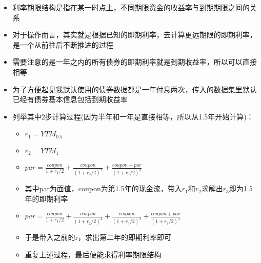 \documentclass[11pt]{article}
\providecommand{\tightlist}{%
      \setlength{\itemsep}{0pt}\setlength{\parskip}{0pt}}
\begin{document}
\begin{itemize}
\tightlist
\item
  利率期限结构是指在某一时点上，不同期限资金的收益率与到期期限之间的关系
\item
  对于操作而言，其实就是根据已知的即期利率，去计算更远期限的即期利率，是一个从前往后不断推进的过程
\item
  需要注意的是一年之内的所有债券的即期利率就是到期收益率，所以可以直接相等
\item
  为了方便起见我默认使用的债券数据都是一年付息两次，传入的数据集里默认已经有债券基本信息包括到期收益率
\item
  列举其中2步计算过程(因为半年和一年是直接相等，所以从1.5年开始计算)：

  \begin{itemize}
  \tightlist
  \item
    \(r_1 = YTM_{0.5}\)
  \item
    \(r_2 = YTM_1\)
  \item
    \(par=\frac{coupon}{1+r_1/2}+\frac{coupon}{(1+r_2/2)^2}+\frac{coupon+par}{(1+r_3/2)^3}\)
  \item
    其中par为面值，coupon为第1.5年的现金流，带入\(r_1\)和\(r_2\)求解出\(r_{3}\)即为1.5年的即期利率
  \item
    \(par=\frac{coupon}{1+r_1/2}+\frac{coupon}{(1+r_2/2)^2}+\frac{coupon}{(1+r_3/2)^3}+\frac{coupon+par}{(1+r_4/2)^4}\)
  \item
    于是带入之前的r，求出第二年的即期利率即可
  \item
    重复上述过程，最后便能求得利率期限结构
  \end{itemize}
\end{itemize}
\end{document}

